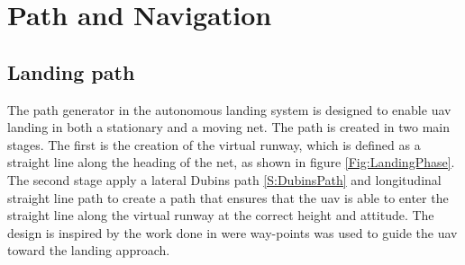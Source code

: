 \chapter{Path and Navigation}
\section{Landing path}\label{Ch:LandingPath}
The path generator in the  autonomous landing system is designed to enable \gls{uav} landing in both a stationary and a moving net. The path is created in two main stages. The first is the creation of the virtual runway, which is defined as a straight line along the heading of the net, as shown in figure \ref{Fig:LandingPhase}. The second stage apply a lateral Dubins path \ref{S:DubinsPath} and longitudinal straight line path to create a path that ensures that the \gls{uav} is able to enter the straight line along the virtual runway at the correct height and attitude. The design is inspired by the work done in \citep{Skulstad&Syversen} were way-points was used to guide the \gls{uav} toward the landing approach.
